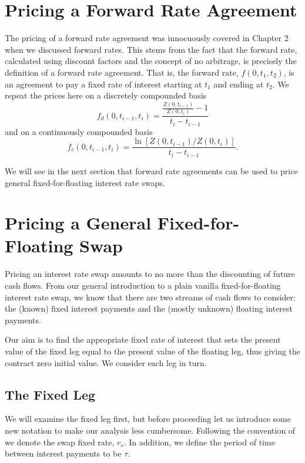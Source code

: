 \section{Pricing a Forward Rate Agreement}
The pricing of a forward rate agreement was innocuously covered in Chapter 2 when we discussed forward rates. This stems from the fact that the forward rate, calculated using discount factors and the concept of no arbitrage, is precisely the definition of a forward rate agreement. That is, the forward rate, $f(0,t_1,t_2)$, is an agreement to pay a fixed rate of interest starting at $t_1$ and ending at $t_2$. We repeat the prices here on a discretely compounded basis
\begin{equation}
    f_d(0, t_{i-1}, t_i) = \frac{\frac{Z(0, t_{i-1})}{Z(0,t_i)} - 1}{t_i - t_{i-1}}
\end{equation}
and on a continuously compounded basis
\begin{equation}
    f_{c}(0,t_{i-1}, t_i) = \frac{\ln [ Z(0,t_{i-1}) / Z(0,t_i)]}{t_i - t_{i-1}}.
\end{equation}

We will see in the next section that forward rate agreements can be used to price general fixed-for-floating interest rate swaps. 

\section{Pricing a General Fixed-for-Floating Swap}
Pricing an interest rate swap amounts to no more than the discounting of future cash flows. From our general introduction to a plain vanilla fixed-for-floating interest rate swap, we know that there are two streams of cash flows to consider: the (known) fixed interest payments and the (mostly unknown) floating interest payments.

Our aim is to find the appropriate fixed rate of interest that sets the present value of the fixed leg equal to the present value of the floating leg, thus giving the contract zero initial value. We consider each leg in turn.

\subsection{The Fixed Leg}
We will examine the fixed leg first, but before proceeding let us introduce some new notation to make our analysis less cumbersome. Following the convention of \cite{wilmott2013paul} we denote the swap fixed rate, $r_s$. In addition, we define the period of time between interest payments to be $\tau$. 


